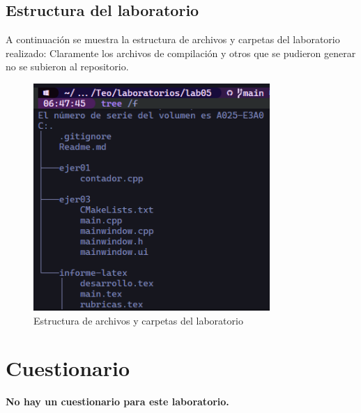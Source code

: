 \subsection {Estructura del laboratorio}

A continuación se muestra la estructura de archivos y carpetas del laboratorio realizado:
Claramente los archivos de compilación y otros que se pudieron generar no se subieron al repositorio.

\begin{figure}[H]
    \centering
    \includegraphics[width=0.8\textwidth]{img/Estructura.png}
    \caption{Estructura de archivos y carpetas del laboratorio}
    \label{fig:estructura}
\end{figure}



\section{Cuestionario}

\textbf{No hay un cuestionario para este laboratorio.}




